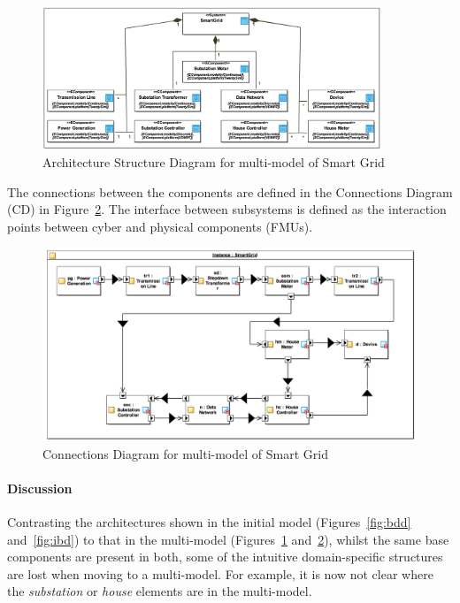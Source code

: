 \begin{figure}[htbp]
\centering
\includegraphics[width=0.9\textwidth]{figures/ASD_mm}
\caption{Architecture Structure Diagram for multi-model of Smart Grid}
\label{fig:asd_mm}
\end{figure}

The connections between the components are defined in the Connections Diagram (CD) in Figure~\ref{fig:cd_mm}. The interface between subsystems is defined as the interaction points between cyber and physical components (FMUs).

\begin{figure}
\centering
\includegraphics[width=1\textwidth]{figures/CD_mm}
\caption{Connections Diagram for multi-model of Smart Grid}
\label{fig:cd_mm}
\end{figure}

\paragraph{Discussion}

Contrasting the architectures shown in the initial model (Figures~\ref{fig:bdd} and~\ref{fig:ibd}) to that in the multi-model (Figures~\ref{fig:asd_mm} and~\ref{fig:cd_mm}), whilst the same base components are present in both, some of the intuitive domain-specific structures are lost when moving to a multi-model. For example, it is now not clear where the \emph{substation} or \emph{house} elements are in the multi-model.

